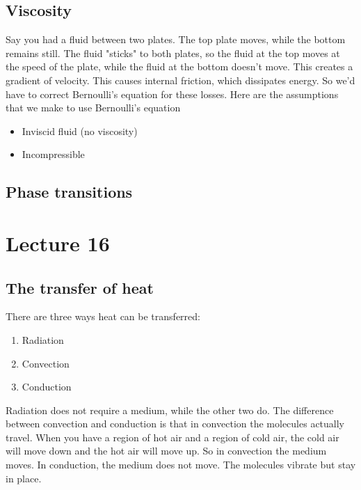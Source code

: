\documentclass{report}
\numberwithin{equation}{section}
\begin{document}
\subsection{Viscosity}
Say you had a fluid between two plates. The top plate moves, while the bottom remains still. The
fluid "sticks" to both plates, so the fluid at the top moves at the speed of the plate, while the fluid at the bottom doesn't move. This creates
a gradient of velocity. This causes internal friction, which dissipates energy. So we'd have to correct Bernoulli's equation for these losses. Here are the assumptions that we make
to use Bernoulli's equation
\begin{itemize}
    \item Inviscid fluid (no viscosity)
    \item Incompressible
\end{itemize}
\subsection{Phase transitions}
\section{Lecture 16}
\subsection{The transfer of heat}
There are three ways heat can be transferred:
\begin{enumerate}
    \item Radiation
    \item Convection
    \item Conduction
\end{enumerate}
Radiation does not require a medium, while the other two do. The difference between convection and conduction is that in
convection the molecules actually travel. When you have a region of hot air and a region of cold air, the cold air will move down and the
hot air will move up. So in convection the medium moves. In conduction, the medium does not move. The molecules vibrate but stay in place. \\
\end{document}
